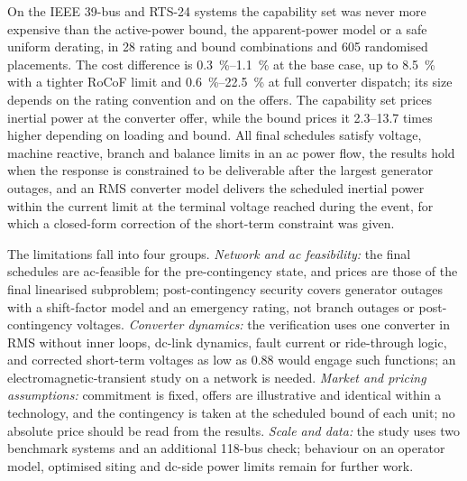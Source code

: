 On the IEEE 39-bus and RTS-24 systems the capability set was never more
expensive than the active-power bound, the apparent-power model or a safe
uniform derating, in \num{28} rating and bound combinations and \num{605}
randomised placements. The cost difference is \SIrange{0.3}{1.1}{\percent} at
the base case, up to \SI{8.5}{\percent} with a tighter RoCoF limit and
\SIrange{0.6}{22.5}{\percent} at full converter dispatch; its size depends on
the rating convention and on the offers. The capability set prices inertial
power at the converter offer, while the bound prices it
\numrange{2.3}{13.7} times higher depending on loading and bound. All final
schedules satisfy voltage, machine reactive, branch and balance limits in an
ac power flow, the results hold when the response is constrained to be
deliverable after the largest generator outages, and an RMS converter model
delivers the scheduled inertial power within the current limit at the
terminal voltage reached during the event, for which a closed-form correction
of the short-term constraint was given.

The limitations fall into four groups. \emph{Network and ac feasibility:} the
final schedules are ac-feasible for the pre-contingency state, and prices are
those of the final linearised subproblem; post-contingency security covers
generator outages with a shift-factor model and an emergency rating, not
branch outages or post-contingency voltages. \emph{Converter dynamics:} the
verification uses one converter in RMS without inner loops, dc-link dynamics,
fault current or ride-through logic, and corrected short-term voltages as low
as \SI{0.88}{\pu} would engage such functions; an electromagnetic-transient
study on a network is needed. \emph{Market and pricing assumptions:}
commitment is fixed, offers are illustrative and identical within a
technology, and the contingency is taken at the scheduled bound of each unit;
no absolute price should be read from the results. \emph{Scale and data:}
the study uses two benchmark systems and an additional 118-bus check;
behaviour on an operator model, optimised siting and dc-side power limits
remain for further work.
